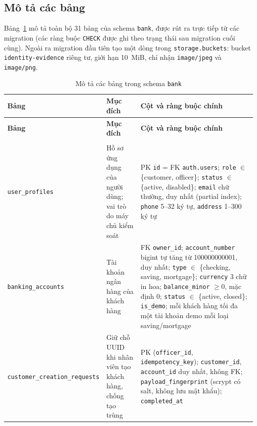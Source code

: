 \subsection{Mô tả các bảng}
\label{sec:ch2-tables}

Bảng~\ref{tab:ch2-tables} mô tả toàn bộ 31 bảng của schema \texttt{bank}, được rút ra trực tiếp từ các migration (các ràng buộc \texttt{CHECK} được ghi theo trạng thái sau migration cuối cùng). Ngoài ra migration đầu tiên tạo một dòng trong \texttt{storage.\allowbreak{}buckets}: bucket \texttt{identity-\allowbreak{}evidence} riêng tư, giới hạn 10~MiB, chỉ nhận \texttt{image/\allowbreak{}jpeg} và \texttt{image/\allowbreak{}png}.

{\footnotesize
\begin{longtable}{>{\raggedright\arraybackslash}p{}>{\raggedright\arraybackslash}p{}>{\raggedright\arraybackslash}p{}}
\caption{Mô tả các bảng trong schema \texttt{bank}}\label{tab:ch2-tables}\\
\toprule
\textbf{Bảng} & \textbf{Mục đích} & \textbf{Cột và ràng buộc chính} \\
\midrule
\endfirsthead
\toprule
\textbf{Bảng} & \textbf{Mục đích} & \textbf{Cột và ràng buộc chính} \\
\midrule
\endhead
\bottomrule
\endfoot
\multicolumn{3}{l}{\textit{Hồ sơ và tài khoản}} \\
\texttt{user\_\allowbreak{}profiles} & Hồ sơ ứng dụng của người dùng; vai trò do máy chủ kiểm soát & PK \texttt{id} = FK \texttt{auth.\allowbreak{}users}; \texttt{role} $\in$ \{customer, officer\}; \texttt{status} $\in$ \{active, disabled\}; \texttt{email} chữ thường, duy nhất (partial index); \texttt{phone} 5--32 ký tự, \texttt{address} 1--300 ký tự \\
\texttt{banking\_\allowbreak{}accounts} & Tài khoản ngân hàng của khách hàng & FK \texttt{owner\_\allowbreak{}id}; \texttt{account\_\allowbreak{}number} bigint tự tăng từ 100000000001, duy nhất; \texttt{type} $\in$ \{checking, saving, mortgage\}; \texttt{currency} 3 chữ in hoa; \texttt{balance\_\allowbreak{}minor} $\geq 0$, mặc định 0; \texttt{status} $\in$ \{active, closed\}; \texttt{is\_\allowbreak{}demo}; mỗi khách hàng tối đa một tài khoản demo mỗi loại saving/mortgage \\
\texttt{customer\_creation\_\allowbreak requests} & Giữ chỗ UUID khi nhân viên tạo khách hàng, chống tạo trùng & PK (\texttt{officer\_\allowbreak{}id}, \texttt{idempotency\_\allowbreak{}key}); \texttt{customer\_\allowbreak{}id}, \texttt{account\_\allowbreak{}id} duy nhất, không FK; \texttt{payload\_\allowbreak{}fingerprint} (scrypt có salt, không lưu mật khẩu); \texttt{completed\_\allowbreak{}at} \\

\end{longtable}}
